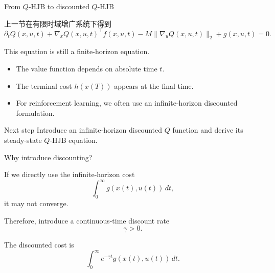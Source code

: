 \documentclass[aspectratio=169]{beamer}
\begin{document}
\begin{frame}{From \(Q\)-HJB to discounted \(Q\)-HJB}

上一节在有限时域增广系统下得到
\[
\partial_t Q(x,u,t)
+
\nabla_x Q(x,u,t)^\top f(x,u,t)
-
M\|\nabla_u Q(x,u,t)\|_2
+
g(x,u,t)
=
0.
\]

\vspace{0.2cm}

This equation is still a finite-horizon equation.

\vspace{0.15cm}

\begin{itemize}
    \item The value function depends on absolute time \(t\).
    \vspace{0.2cm}

    \item The terminal cost \(h(x(T))\) appears at the final time.
    \vspace{0.2cm}

    \item For reinforcement learning, we often use an infinite-horizon discounted formulation.
\end{itemize}

\vspace{0.15cm}

\begin{block}{Next step}
\small
Introduce an infinite-horizon discounted \(Q\) function and derive its steady-state \(Q\)-HJB equation.
\end{block}

\end{frame}


\begin{frame}{Why introduce discounting?}

If we directly use the infinite-horizon cost
\[
\int_0^\infty g(x(t),u(t))\,dt,
\]
it may not converge.

\vspace{0.25cm}

Therefore, introduce a continuous-time discount rate
\[
\gamma>0.
\]

\vspace{0.15cm}

The discounted cost is
\[
\int_0^\infty e^{-\gamma t}g(x(t),u(t))\,dt.
\]

\vspace{0.2cm}



\end{frame}
\end{document}
